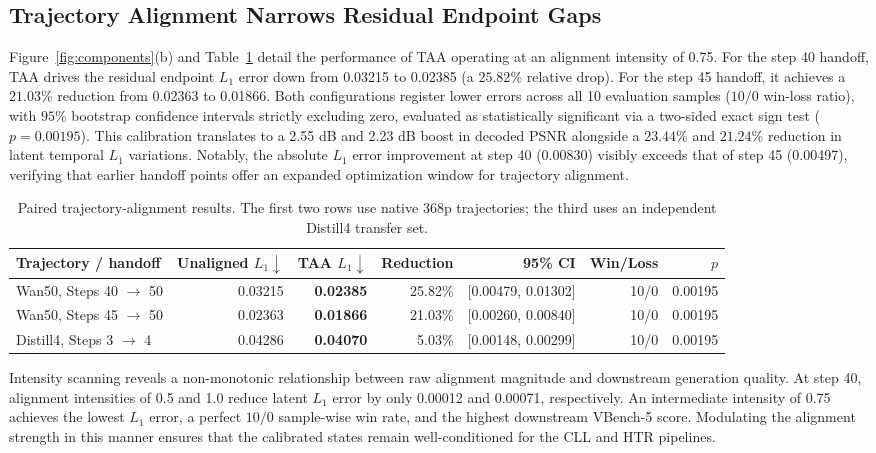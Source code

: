 \subsection{Trajectory Alignment Narrows Residual Endpoint Gaps}

Figure~\ref{fig:components}(b) and Table~\ref{tab:alignment} detail the performance of TAA operating at an
alignment intensity of 0.75. For the step 40 handoff, TAA drives the
residual endpoint \(L_1\) error down from 0.03215 to 0.02385 (a
\(25.82\%\) relative drop). For the step 45 handoff, it achieves a
\(21.03\%\) reduction from 0.02363 to 0.01866. Both configurations
register lower errors across all 10 evaluation samples (\(10/0\)
win-loss ratio), with \(95\%\) bootstrap confidence intervals strictly
excluding zero, evaluated as statistically significant via a two-sided
exact sign test (\(p=0.00195\)). This calibration translates to a 2.55
dB and 2.23 dB boost in decoded PSNR alongside a \(23.44\%\) and
\(21.24\%\) reduction in latent temporal \(L_1\) variations. Notably,
the absolute \(L_1\) error improvement at step 40 (0.00830) visibly
exceeds that of step 45 (0.00497), verifying that earlier handoff points
offer an expanded optimization window for trajectory alignment.

\begin{table}[t]
\centering
\small
\begin{tabular}{lrrrrrr}
\toprule
Trajectory / handoff & Unaligned $L_1\downarrow$ & TAA $L_1\downarrow$ & Reduction & 95\% CI & Win/Loss & $p$ \\
\midrule
Wan50, Steps 40 $\rightarrow$ 50 & 0.03215 & \textbf{0.02385} & 25.82\% & [0.00479, 0.01302] & 10/0 & 0.00195 \\
Wan50, Steps 45 $\rightarrow$ 50 & 0.02363 & \textbf{0.01866} & 21.03\% & [0.00260, 0.00840] & 10/0 & 0.00195 \\
Distill4, Steps 3 $\rightarrow$ 4 & 0.04286 & \textbf{0.04070} & 5.03\% & [0.00148, 0.00299] & 10/0 & 0.00195 \\
\bottomrule
\end{tabular}
\caption{Paired trajectory-alignment results. The first two rows use
native 368p trajectories; the third uses an independent Distill4
transfer set.}
\label{tab:alignment}
\end{table}

Intensity scanning reveals a non-monotonic relationship between raw
alignment magnitude and downstream generation quality. At step 40,
alignment intensities of 0.5 and 1.0 reduce latent \(L_1\) error by only
0.00012 and 0.00071, respectively. An intermediate intensity of 0.75
achieves the lowest \(L_1\) error, a perfect \(10/0\) sample-wise win
rate, and the highest downstream VBench-5 score. Modulating the
alignment strength in this manner ensures that the calibrated states
remain well-conditioned for the CLL and HTR pipelines.

